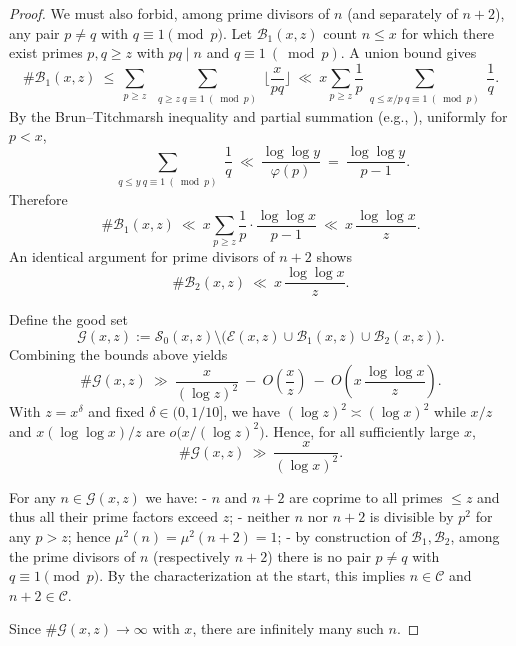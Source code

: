 \begin{proof}
We must also forbid, among prime divisors of $n$ (and separately of $n+2$), any pair $p\ne q$ with $q\equiv1\pmod p$. Let $\mathcal B_1(x,z)$ count $n\le x$ for which there exist primes $p,q\ge z$ with $pq\mid n$ and $q\equiv1\ (\bmod p)$. A union bound gives
$$
\#\mathcal B_1(x,z)\ \le\ \sum_{p\ge z}\ \sum_{\substack{q\ge z\ q\equiv1\ (\bmod p)}}\Big\lfloor\frac{x}{pq}\Big\rfloor
\ \ll\ x\sum_{p\ge z}\frac{1}{p}\sum_{\substack{q\le x/p\ q\equiv1\ (\bmod p)}}\frac{1}{q}.
$$
By the Brun--Titchmarsh inequality and partial summation (e.g., \cite{MV2007,IK2004}), uniformly for $p<x$,
$$
\sum_{\substack{q\le y\ q\equiv1\ (\bmod p)}}\frac{1}{q}\ \ll\ \frac{\log\log y}{\varphi(p)}\ =\ \frac{\log\log y}{p-1}.
$$
Therefore
$$
\#\mathcal B_1(x,z)\ \ll\ x\sum_{p\ge z}\frac{1}{p}\cdot\frac{\log\log x}{p-1}
\ \ll\ x\,\frac{\log\log x}{z}.
$$
An identical argument for prime divisors of $n+2$ shows
$$
\#\mathcal B_2(x,z)\ \ll\ x\,\frac{\log\log x}{z}.
$$

Define the good set
$$
\mathcal G(x,z):=\mathcal S_0(x,z)\setminus\bigl(\mathcal E(x,z)\cup\mathcal B_1(x,z)\cup\mathcal B_2(x,z)\bigr).
$$
Combining the bounds above yields
$$
\#\mathcal G(x,z)\ \gg\ \frac{x}{(\log z)^2}\ -\ O\!\left(\frac{x}{z}\right)\ -\ O\!\left(x\,\frac{\log\log x}{z}\right).
$$
With $z=x^{\delta}$ and fixed $\delta\in(0,1/10]$, we have $(\log z)^2\asymp(\log x)^2$ while $x/z$ and $x(\log\log x)/z$ are $o\bigl(x/(\log z)^2\bigr)$. Hence, for all sufficiently large $x$,
$$
\#\mathcal G(x,z)\ \gg\ \frac{x}{(\log x)^2}.
$$

For any $n\in\mathcal G(x,z)$ we have:
- $n$ and $n+2$ are coprime to all primes $\le z$ and thus all their prime factors exceed $z$;
- neither $n$ nor $n+2$ is divisible by $p^2$ for any $p>z$; hence $\mu^2(n)=\mu^2(n+2)=1$;
- by construction of $\mathcal B_1,\mathcal B_2$, among the prime divisors of $n$ (respectively $n+2$) there is no pair $p\ne q$ with $q\equiv1\pmod p$.
By the characterization at the start, this implies $n\in\mathcal C$ and $n+2\in\mathcal C$.

Since $\#\mathcal G(x,z)\to\infty$ with $x$, there are infinitely many such $n$. 
\end{proof}

